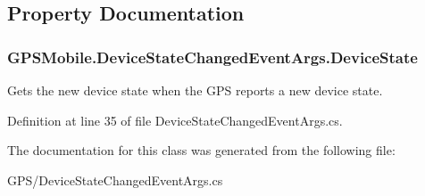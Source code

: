 \subsection{Property Documentation}
\hypertarget{class_g_p_s_mobile_1_1_device_state_changed_event_args_a968ff2111d16cb1036db641703948cb5}{
\subsubsection[{DeviceState}]{ GPSMobile.DeviceStateChangedEventArgs.DeviceState}}
\label{class_g_p_s_mobile_1_1_device_state_changed_event_args_a968ff2111d16cb1036db641703948cb5}


Gets the new device state when the GPS reports a new device state. 

Definition at line 35 of file DeviceStateChangedEventArgs.cs.

The documentation for this class was generated from the following file:\begin{DoxyCompactItemize}
\item 
GPS/DeviceStateChangedEventArgs.cs\end{DoxyCompactItemize}
